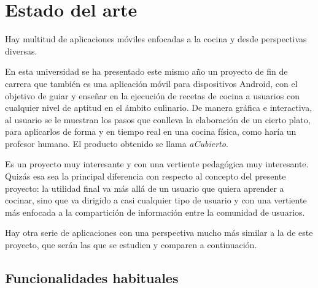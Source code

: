 \section{Estado del arte}
\label{sec:estado-del-arte}

Hay multitud de aplicaciones móviles enfocadas a la cocina y desde perspectivas
diversas.

En esta universidad se ha presentado este mismo año un proyecto de
fin de carrera que también es una aplicación móvil para dispositivos Android,
con el objetivo de guiar y enseñar en la ejecución de recetas de cocina a
usuarios con cualquier nivel de aptitud en el ámbito culinario. De manera
gráfica e interactiva, al usuario se le muestran los pasos que conlleva la
elaboración de un cierto plato, para aplicarlos de forma y en tiempo real en
una cocina física, como haría un profesor humano. El producto obtenido se
llama \textit{aCubierto}.\cite{a-cubierto}

Es un proyecto muy interesante y con una vertiente pedagógica muy interesante.
Quizás esa sea la principal diferencia con respecto al concepto del presente
proyecto: la utilidad final va más allá de un usuario que quiera aprender a
cocinar, sino que va dirigido a casi cualquier tipo de usuario y con una
vertiente más enfocada a la compartición de información entre la comunidad de
usuarios.

Hay otra serie de aplicaciones con una perspectiva mucho más similar a la de
este proyecto,\cite{mejores-apps-cocina} que serán las que se estudien y
comparen a continuación.

\subsection{Funcionalidades habituales}

